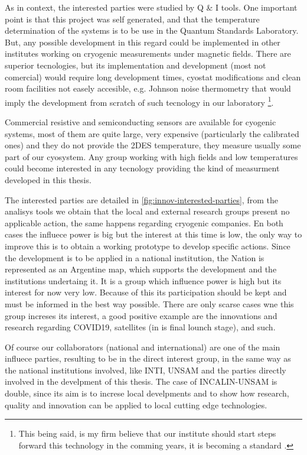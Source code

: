 As in context, the interested parties were studied by Q \& I tools. One important point is that this project was self generated, and that the temperature determination of the systems is to be use in the Quantum Standards Laboratory. But, any possible development in this regard could be implemented in other institutes working on cryogenic measurements under magnetic fields. There are superior tecnologies, but its implementation and development (most not comercial) would require long development times, cyostat modifications and clean room facilities not easely accesible, e.g. Johnson noise thermometry \cite{Johnson1928,nyquist1928,qu2019johnson} that would imply the development from scratch of such tecnology in our laboratory 
\footnote{This being said, is my firm believe that our institute should start steps forward this technology in the comming years, it is becoming a standard \cite{flowers2017boltzmann,Department2013}.}.

Commercial resistive and semiconducting sensors are available for cyogenic systems, most of them are quite large, very expensive (particularly the calibrated ones) and they do not provide the 2DES temperature, they measure usually some part of our cyosystem. Any group working with high fields and low temperatures could become interested in any tecnology providing the kind of measurment developed in this thesis.

The interested parties are detailed in \ref{fig:innov-interested-parties}, from the analisys tools we obtain that the local and external research groups present no applicable action, the same happens regarding cryogenic companies. En both cases the influece power is big but the interest at this time is low, the only way to improve this is to obtain a working prototype to develop specific actions.
Since the development is to be applied in a national institution, the Nation is represented as an Argentine map, which supports the development and the institutions undertaing it. It is a group which influence power is high but its interest for now very low.  Because of this its participation should be kept and must be informed in the best way possible. There are only scarse cases wne this group increses its interest, a good positive example are the innovations and research regarding COVID19, satellites (in is final lounch stage), and such. 

Of course our collaborators (national and international) are one of the main influece parties, resulting to be in the direct interest group, in the same way as the national institutions involved, like INTI, UNSAM and the parties directly involved in the develpment of this thesis.
The case of INCALIN-UNSAM is double, since its aim is to increse local develpments and to show how research, quality and innovation can be applied to local cutting edge technologies.

